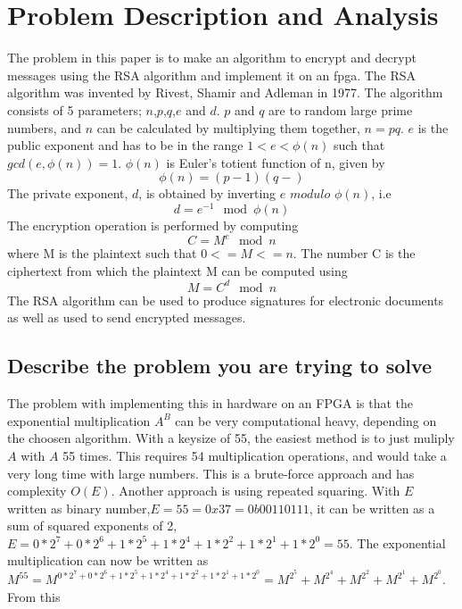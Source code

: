 \section{Problem Description and Analysis}
The problem in this paper is to make an algorithm to encrypt and decrypt messages using the
RSA algorithm and implement it on an fpga. The RSA algorithm was invented by Rivest, Shamir
and Adleman in 1977. The algorithm consists of 5 parameters; $n$,$p$,$q$,$e$ and $d$. 
$p$ and $q$ are to random large prime numbers, and $n$ can be calculated by multiplying 
them together, $n=pq$. $e$ is the public exponent and has to be in the range $1<e<\phi(n)$ 
such that $gcd(e,\phi(n))=1$. $\phi(n)$ is Euler's totient function of n, given by
\begin{equation}
    \phi(n)=(p-1)(q-)
\end{equation}
The private exponent, $d$, is obtained by inverting $e$ $modulo$ $\phi(n)$, i.e
\begin{equation}
    d=e^{-1}\mod{\phi(n)}
\end{equation}
The encryption operation is performed by computing
\begin{equation}
    C=M^e\mod{n}
\end{equation}
where M is the plaintext such that $0<=M<=n$. The number C is the ciphertext from 
which the plaintext M can be computed using
\begin{equation}
    M=C^d\mod{n}
\end{equation}
The RSA algorithm can be used to produce signatures for electronic documents as well
as used to send encrypted messages. 

\subsection{Describe the problem you are trying to solve}
The problem with implementing this in hardware on an FPGA is that the exponential multiplication
$A^B$ can be very computational heavy, depending on the choosen algorithm. With a keysize of 55,
the easiest method is to just muliply $A$ with $A$ 55 times. This requires 54 multiplication
operations, and would take a very long time with large numbers. This is a brute-force approach
and has complexity $O(E)$. Another approach is using repeated squaring. With $E$ written as binary
number,$E=55=0x37=0b00110111$, it can be written as a sum of squared exponents of 2, 
$E=0*2^7 + 0*2^6 + 1*2^5 + 1*2^4 + 1*2^2 + 1*2^1 + 1*2^0=55$. The exponential multiplication can 
now be written as $M^{55}=M^{0*2^7 + 0*2^6 + 1*2^5 + 1*2^4 + 1*2^2 + 1*2^1 + 1*2^0} = M^{2^5} + M^{2^4} + M^{2^2} + M^{2^1} + M^{2^0}$. 
From this 
